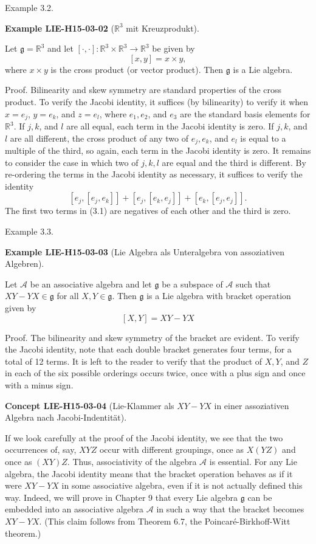 \documentclass[10pt, letterpaper]{article}
\newcommand{\R}{\mathbb{R}}
\newcommand{\CustomHeading}[3]{%
  \par\medskip\noindent%
  \textbf{#1 #2} \textnormal{(#3)}.\enskip%
}
\newenvironment{EXA}[2]{\begin{unitbox}\CustomHeading{Example}{#1}{#2}}{\end{unitbox}}
\newenvironment{CONC}[2]{\begin{unitbox}\CustomHeading{Concept}{#1}{#2}}{\end{unitbox}}
\begin{document}
Example 3.2. 

\begin{EXA}{LIE-H15-03-02}{$\R^3$ mit Kreuzprodukt}
Let $\mathfrak{g}=\mathbb{R}^{3}$ and let $[\cdot, \cdot]: \mathbb{R}^{3} \times \mathbb{R}^{3} \rightarrow \mathbb{R}^{3}$ be given by
$$
[x, y]=x \times y,
$$
where $x \times y$ is the cross product (or vector product). Then $\mathfrak{g}$ is a Lie algebra.

Proof. Bilinearity and skew symmetry are standard properties of the cross product. To verify the Jacobi identity, it suffices (by bilinearity) to verify it when $x=e_{j}$, $y=e_{k}$, and $z=e_{l}$, where $e_{1}, e_{2}$, and $e_{3}$ are the standard basis elements for $\mathbb{R}^{3}$. If $j, k$, and $l$ are all equal, each term in the Jacobi identity is zero. If $j, k$, and $l$ are all different, the cross product of any two of $e_{j}, e_{k}$, and $e_{l}$ is equal to a multiple of the third, so again, each term in the Jacobi identity is zero. It remains to consider the case in which two of $j, k, l$ are equal and the third is different. By re-ordering the terms in the Jacobi identity as necessary, it suffices to verify the identity
$$
\left[e_{j},\left[e_{j}, e_{k}\right]\right]+\left[e_{j},\left[e_{k}, e_{j}\right]\right]+\left[e_{k},\left[e_{j}, e_{j}\right]\right] .
$$
The first two terms in (3.1) are negatives of each other and the third is zero.
\end{EXA}


Example 3.3. 

\begin{EXA}{LIE-H15-03-03}{Lie Algebra als Unteralgebra von assoziativen Algebren}
Let $\mathcal{A}$ be an associative algebra and let $\mathfrak{g}$ be a subspace of $\mathcal{A}$ such that $X Y-Y X \in \mathfrak{g}$ for all $X, Y \in \mathfrak{g}$. Then $\mathfrak{g}$ is a Lie algebra with bracket operation given by
$$
[X, Y]=X Y-Y X
$$

Proof. The bilinearity and skew symmetry of the bracket are evident. To verify the Jacobi identity, note that each double bracket generates four terms, for a total of 12 terms. It is left to the reader to verify that the product of $X, Y$, and $Z$ in each of the six possible orderings occurs twice, once with a plus sign and once with a minus sign.
\end{EXA}

\begin{CONC}{LIE-H15-03-04}{Lie-Klammer als $XY-YX$ in einer assoziativen Algebra nach Jacobi-Indentität}
If we look carefully at the proof of the Jacobi identity, we see that the two occurrences of, say, $X Y Z$ occur with different groupings, once as $X(Y Z)$ and once as $(X Y) Z$. Thus, associativity of the algebra $\mathcal{A}$ is essential. For any Lie algebra, the Jacobi identity means that the bracket operation behaves as if it were $X Y-Y X$ in some associative algebra, even if it is not actually defined this way. Indeed, we will prove in Chapter 9 that every Lie algebra $\mathfrak{g}$ can be embedded into an associative algebra $\mathcal{A}$ in such a way that the bracket becomes $X Y-Y X$. (This claim follows from Theorem 6.7, the Poincaré-Birkhoff-Witt theorem.)
\end{CONC}
\end{document}

